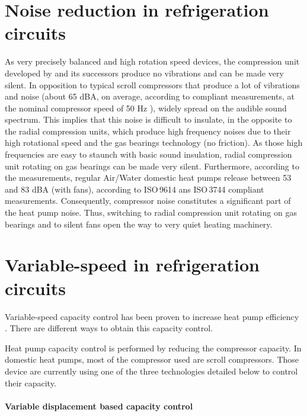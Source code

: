 \section{Noise reduction in refrigeration circuits}

As very precisely balanced and high rotation speed devices, the
compression unit developed by \citet{schiffmann-2008a} and its
successors produce no vibrations and can be made very silent. In
opposition to typical scroll compressors that produce a lot of
vibrations and noise (about 65 dBA, on average, according to
\citet{ARI-270-94} compliant measurements, at the nominal compressor
speed of 50 Hz \citep[Fig.\,43,
p.\,37.26]{ASHRAE-HVACeq-2008a-Compressor}), widely spread on the
audible sound spectrum. This implies that this noise is difficult to
insulate, in the opposite to the radial compression units, which
produce high frequency noises due to their high rotational speed and
the gas bearings technology (no friction). As those high frequencies
are easy to staunch with basic sound insulation, radial compression
unit rotating on gas bearings can be made very silent. Furthermore,
according to the \citet{Eurovent-2010a} measurements, regular
Air/Water domestic heat pumps release between 53 and 83 dBA (with
fans), according to ISO\,9614 \citep{EN-ISO-9614-1} ans ISO\,3744
\citep{ISO-3744-2010a} compliant measurements. Consequently,
compressor noise constitutes a significant part of the heat pump
noise. Thus, switching to radial compression unit rotating on gas
bearings and to silent fans open the way to very quiet heating
machinery.

\section{Variable-speed in refrigeration circuits}

Variable-speed capacity control has been proven to increase heat pump
efficiency \citep{Karlsson-2003a,Karlsson-Fahlen-2008a}. There are
different ways to obtain this capacity control.

Heat pump capacity control is performed by reducing the compressor
capacity.  In domestic heat pumps, most of the compressor used are
scroll compressors.  Those device are currently using one of the three
technologies detailed below to control their capacity.

\paragraph{Variable displacement based capacity control}


